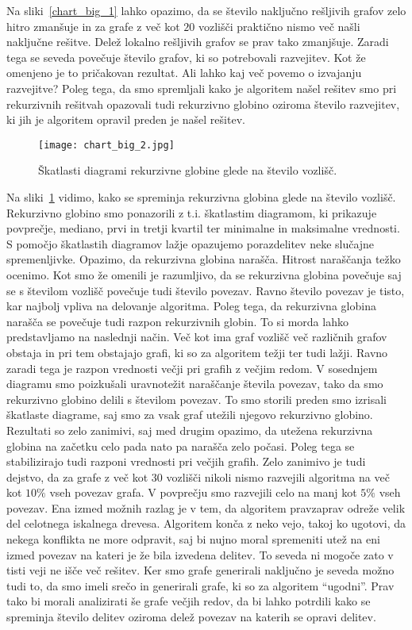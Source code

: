 \documentclass[12pt,a4paper,twoside]{article}
\theoremstyle{definition} %
\theoremstyle{plain} %
\numberwithin{equation}{section}  %
\begin{document}
Na sliki~\ref{chart_big_1} lahko opazimo, da se število naključno rešljivih grafov zelo hitro zmanšuje in za grafe z več kot $20$ vozlišči praktično nismo več našli naključne rešitve. Delež lokalno rešljivih grafov se prav tako zmanjšuje. Zaradi tega se seveda povečuje število grafov, ki so potrebovali razvejitev.  Kot že omenjeno je to pričakovan rezultat. Ali lahko kaj več povemo o izvajanju razvejitve? Poleg tega, da smo spremljali kako je algoritem našel rešitev smo pri rekurzivnih rešitvah opazovali tudi rekurzivno globino oziroma število razvejitev, ki jih je algoritem opravil preden je našel rešitev. 
 \begin{figure}[h!]
\caption{Škatlasti diagrami rekurzivne globine glede na število vozlišč.}
\label{chart_big_2}
\centering
    \texttt{[image: chart\_big\_2.jpg]}
    \end{figure}
Na sliki~\ref{chart_big_2} vidimo, kako se spreminja rekurzivna globina glede na število vozlišč. Rekurzivno globino smo ponazorili z t.i. škatlastim diagramom, ki prikazuje povprečje, mediano, prvi in tretji kvartil ter minimalne in maksimalne vrednosti. S pomočjo škatlastih diagramov lažje opazujemo porazdelitev neke slučajne spremenljivke. Opazimo, da rekurzivna globina narašča. Hitrost naraščanja težko ocenimo. Kot smo že omenili je razumljivo, da se rekurzivna globina povečuje saj se s številom vozlišč povečuje tudi število povezav. Ravno število povezav je tisto, kar najbolj vpliva na delovanje algoritma. Poleg tega, da rekurzivna globina narašča se povečuje tudi razpon rekurzivnih globin. To si morda lahko predstavljamo na naslednji način. Več kot ima graf vozlišč več različnih grafov obstaja in pri tem obstajajo grafi, ki so za algoritem težji ter tudi lažji. Ravno zaradi tega je razpon vrednosti večji pri grafih z večjim redom. V sosednjem diagramu smo poizkušali uravnotežit naraščanje števila povezav, tako da smo rekurzivno globino delili s številom povezav. To smo storili preden smo izrisali škatlaste diagrame, saj smo za vsak graf utežili njegovo rekurzivno globino. Rezultati so zelo zanimivi, saj med drugim opazimo, da utežena rekurzivna globina na začetku celo pada nato pa narašča zelo počasi. Poleg tega se stabilizirajo tudi razponi vrednosti pri večjih grafih. Zelo zanimivo je tudi dejstvo, da za grafe z več kot $30$ vozlišči nikoli nismo razvejili algoritma na več kot $10\%$ vseh povezav grafa. V povprečju smo razvejili celo na manj kot $5\%$ vseh povezav. Ena izmed možnih razlag je v tem, da algoritem pravzaprav odreže velik del celotnega iskalnega drevesa. Algoritem konča z neko vejo, takoj ko ugotovi, da nekega konflikta ne more odpravit, saj bi nujno moral spremeniti utež na eni izmed povezav na kateri je že bila izvedena delitev. To seveda ni mogoče zato v tisti veji ne išče več rešitev.  Ker smo grafe generirali naključno je seveda možno tudi to, da smo imeli srečo in generirali grafe, ki so za algoritem ``ugodni''. Prav tako bi morali analizirati še grafe večjih redov, da bi lahko potrdili kako se spreminja število delitev oziroma delež povezav na katerih se opravi delitev.
\end{document}
